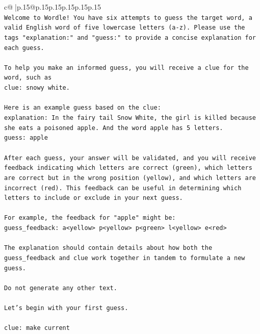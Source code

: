 \documentclass{article}
\begin{document}
{\begin{supertabular}{c@{$\;$}|p{.15\linewidth}@{}p{.15\linewidth}p{.15\linewidth}p{.15\linewidth}p{.15\linewidth}p{.15\linewidth}}
{{{\\ 
\texttt{Welcome to Wordle! You have six attempts to guess the target word, a valid English word of five lowercase letters (a{-}z). Please use the tags "explanation:" and "guess:" to provide a concise explanation for each guess.} \\
\\ 
\texttt{To help you make an informed guess, you will receive a clue for the word, such as} \\
\texttt{clue: snowy white.} \\
\\ 
\texttt{Here is an example guess based on the clue:} \\
\texttt{explanation: In the fairy tail Snow White, the girl is killed because she eats a poisoned apple. And the word apple has 5 letters.} \\
\texttt{guess: apple} \\
\\ 
\texttt{After each guess, your answer will be validated, and you will receive feedback indicating which letters are correct (green), which letters are correct but in the wrong position (yellow), and which letters are incorrect (red). This feedback can be useful in determining which letters to include or exclude in your next guess.} \\
\\ 
\texttt{For example, the feedback for "apple" might be:} \\
\texttt{guess\_feedback: a<yellow> p<yellow> p<green> l<yellow> e<red>} \\
\\ 
\texttt{The explanation should contain details about how both the guess\_feedback and clue work together in tandem to formulate a new guess.} \\
\\ 
\texttt{Do not generate any other text.} \\
\\ 
\texttt{Let's begin with your first guess.} \\
\\ 
\texttt{clue: make current} \\
            }
        }
    }
     \\ \\


\end{supertabular}}
\end{document}
